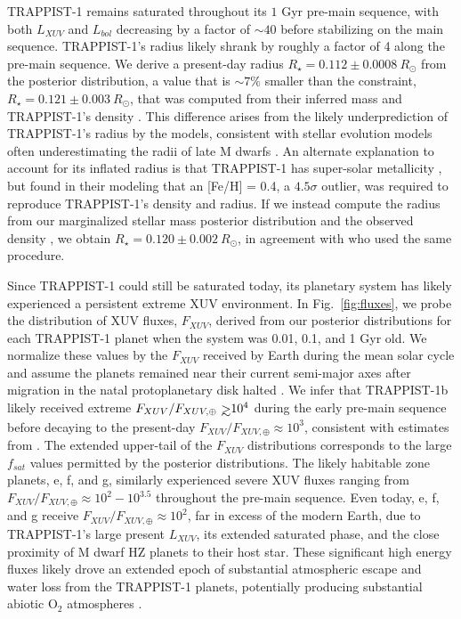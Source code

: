 \documentclass[twocolumn]{aastex62}
\def\gsim{~\rlap{$>$}{\lower 1.0ex\hbox{$\sim$}}}
\begin{document}
TRAPPIST-1 remains saturated throughout its $1$ Gyr pre-main sequence, with both $L_{XUV}$ and $L_{bol}$ decreasing by a factor of ${\sim}40$ before stabilizing on the main sequence. TRAPPIST-1's radius likely shrank by roughly a factor of 4 along the pre-main sequence. We derive a present-day radius $R_{\star} = 0.112 \pm{0.0008} \ R_{\odot}$ from the posterior distribution, a value that is ${\sim} 7\%$ smaller than the \citet{vanGrootel2018} constraint, $R_{\star} = 0.121 \pm {0.003} \ R_{\odot}$, that was computed from their inferred mass and TRAPPIST-1's density \citep{Delrez2018}. This difference arises from the likely underprediction of TRAPPIST-1's radius by the \citet{Baraffe2015} models, consistent with stellar evolution models often underestimating the radii of late M dwarfs \citep{Reid2005,Spada2013}. An alternate explanation to account for its inflated radius is that TRAPPIST-1 has super-solar metallicity \citep{Burgasser2017,vanGrootel2018}, but \citet{vanGrootel2018} found in their modeling that an [Fe/H] = 0.4, a $4.5\sigma$ outlier, was required to reproduce TRAPPIST-1's density and radius. If we instead compute the radius from our marginalized stellar mass posterior distribution and the observed density \citep{Delrez2018}, we obtain $R_{\star} = 0.120 \pm{0.002} \ R_{\odot}$, in agreement with \citet{vanGrootel2018} who used the same procedure.

Since TRAPPIST-1 could still be saturated today, its planetary system has likely experienced a persistent extreme XUV environment. In Fig.~\ref{fig:fluxes}, we probe the distribution of XUV fluxes, $F_{XUV}$, derived from our posterior distributions for each TRAPPIST-1 planet when the system was 0.01, 0.1, and 1 Gyr old. We normalize these values by the $F_{XUV}$ received by Earth during the mean solar cycle \citep[$F_{XUV,\oplus} = 3.88$ erg s$^{-1}$cm$^{-2}$,][]{Ribas2005} and assume the planets remained near their current semi-major axes after migration in the natal protoplanetary disk halted \citep{Luger2017}. We infer that TRAPPIST-1b likely received extreme $F_{XUV}/F_{XUV, \oplus} \gsim 10^4$ during the early pre-main sequence before decaying to the present-day $F_{XUV}/F_{XUV, \oplus} \approx 10^3$, consistent with estimates from \citet{Wheatley2017}. The extended upper-tail of the $F_{XUV}$ distributions corresponds to the large $f_{sat}$ values permitted by the posterior distributions. The likely habitable zone planets, e, f, and g, similarly experienced severe XUV fluxes ranging from $F_{XUV}/F_{XUV, \oplus} \approx 10^2 - 10^{3.5}$ throughout the pre-main sequence. Even today, e, f, and g receive $F_{XUV}/F_{XUV, \oplus} \approx 10^2$, far in excess of the modern Earth, due to TRAPPIST-1's large present $L_{XUV}$, its extended saturated phase, and the close proximity of M dwarf HZ planets to their host star. These significant high energy fluxes likely drove an extended epoch of substantial atmospheric escape and water loss from the TRAPPIST-1 planets, potentially producing substantial abiotic O$_2$ atmospheres \citep{Luger2015,Bolmont2017,Bourrier2017a}.
\end{document}
